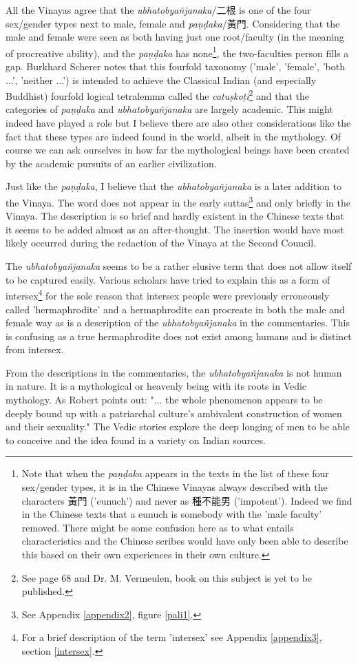 All the Vinayas agree that the {\em ubhatob­yañ­janaka}/二根 is one of the four sex/gender types next to male, female and {\em paṇḍaka}/黃門. Considering that the male and female were seen as both having just one root/faculty (in the meaning of procreative ability), and the {\em paṇḍaka} has none\footnote{Note that when the {\em paṇḍaka} appears in the texts in the list of these four sex/gender types, it is in the Chinese Vinayas always described with the characters 黃門 ('eunuch') and never as 種不能男 ('impotent'). Indeed we find in the Chinese texts that a eunuch is somebody with the 'male faculty' removed. There might be some confusion here as to what entails characteristics and the Chinese scribes would have only been able to describe this based on their own experiences in their own culture.}, the two-faculties person fills a gap. Burkhard Scherer notes that this fourfold taxonomy ('male', 'female', 'both ...', 'neither ...') is intended to achieve the Classical Indian (and especially Buddhist) fourfold logical tetralemma called the {\em catuṣkoṭi}\footnote{See \cite{scherer} page 68 and Dr. M. Vermeulen, book on this subject is yet to be published.} and that the categories of {\em paṇḍaka} and {\em ubhatob­yañ­janaka} are largely academic. This might indeed have played a role but I believe there are also other considerations like the fact that these types are indeed found in the world, albeit in the mythology. Of course we can ask ourselves in how far the mythological beings have been created by the academic pursuits of an earlier civilization. 

Just like the {\em paṇḍaka}, I believe that the {\em ubhatob­yañ­janaka} is a later addition to the Vinaya. The word does not appear in the early suttas\footnote{See Appendix \ref{appendix2}, figure \ref{pali1}.} and only briefly in the Vinaya. The description is so brief and hardly existent in the Chinese texts that it seems to be added almost as an after-thought. The insertion would have most likely occurred during the redaction of the Vinaya at the Second Council.

The {\em ubhatob­yañ­janaka} seems to be a rather elusive term that does not allow itself to be captured easily. Various scholars have tried to explain this as a form of intersex\footnote{For a brief description of the term 'intersex' see Appendix \ref{appendix3}, section \ref{intersex}.} for the sole reason that intersex people were previously erroneously called 'hermaphrodite' and a hermaphrodite can procreate in both the male and female way as is a description of the {\em ubhatob­yañ­janaka} in the commentaries. This is confusing as a true hermaphrodite does not exist among humans and is distinct from intersex. 

From the descriptions in the commentaries, the {\em ubhatob­yañ­janaka} is not human in nature. It is a mythological or heavenly being with its roots in  Vedic mythology. As Robert \cite{goldman} points out: "... the whole phenomenon appears to be deeply bound up with a patriarchal culture's ambivalent construction of women and their sexuality." The Vedic stories explore the deep longing of men to be able to conceive and the idea found in a variety on Indian sources.

